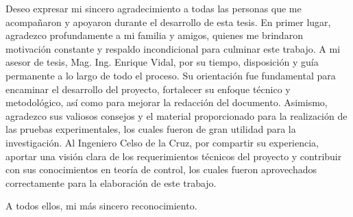 \clearpage
\noindent
Deseo expresar mi sincero agradecimiento a todas las personas que me acompañaron y apoyaron durante el desarrollo de esta tesis. En primer lugar, agradezco profundamente a mi familia y amigos, quienes me brindaron motivación constante y respaldo incondicional para culminar este trabajo. A mi asesor de tesis, Mag. Ing. Enrique Vidal, por su tiempo, disposición y guía permanente a lo largo de todo el proceso. Su orientación fue fundamental para encaminar el desarrollo del proyecto, fortalecer su enfoque técnico y metodológico, así como para mejorar la redacción del documento. Asimismo, agradezco sus valiosos consejos y el material proporcionado para la realización de las pruebas experimentales, los cuales fueron de gran utilidad para la investigación. Al Ingeniero Celso de la Cruz, por compartir su experiencia, aportar una visión clara de los requerimientos técnicos del proyecto y contribuir con sus conocimientos en teoría de control, los cuales fueron aprovechados correctamente para la elaboración de este trabajo.

\noindent
A todos ellos, mi más sincero reconocimiento.